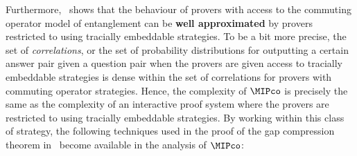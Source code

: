 Furthermore,~\cite{linTracialEmbeddableStrategies2024} shows that the behaviour of provers with access to the commuting operator model of entanglement can be \textbf{well approximated} by provers restricted to using tracially embeddable strategies. To be a bit more precise, the set of \textit{correlations}, or the set of probability distributions for outputting a certain answer pair given a question pair when the provers are given access to tracially embeddable strategies is dense within the set of correlations for provers with commuting operator strategies. Hence, the complexity of $\MIPco$ is precisely the same as the complexity of an interactive proof system where the provers are restricted to using tracially embeddable strategies. By working within this class of strategy, the following techniques used in the proof of the gap compression theorem in~\cite{jiMIPRE2022a} become available in the analysis of $\MIPco$: 
